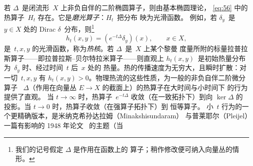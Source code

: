 \documentclass[11pt]{amsart}
\theoremstyle{definition}
\theoremstyle{remark}
\theoremstyle{plain}
\numberwithin{equation}{section}
\renewcommand{\:}{\colon}
\DeclareMathOperator{\spec}{spec}
\begin{document}
若 $\Delta $~是闭流形~$X$ 上非负自伴的二阶椭圆算子，则由基本椭圆理论，
\eqref{eq:56} 中的热算子~$H_t$ 存在。它是\emph{磨光算子}：$H_t$~把分布
映为光滑函数。
例如，若 $\delta _y$~是~$y\in X$ 处的 Dirac
$\delta $~分布，则\footnote{我们的记号假定 $\Delta $ 是作用在函数上的
算子；稍作修改便可纳入向量丛的情形。}
  \begin{equation}\label{eq:59}
     h_t(x,y) = \left( e^{-t\Delta }\delta _y \right)\!(x),\qquad x\in X, 
  \end{equation}
是~$t,x,y$ 的光滑函数，称为\emph{热核}。若 $\Delta $~是~$X$ 上某个黎曼
度量所附的标量拉普拉斯算子——即拉普拉斯–贝尔特拉米算子——则直观上
$h_t(x,y)$~是初始热量分布为~$\delta _y$ 时、经过时间~$t$ 后~$x$ 处的
热量。热的传播速度为无穷大，且瞬时扩散：对一切~$t,x,y$ 有
$h_t(x,y)>0$。物理热流的这些性质，为一般的非负自伴二阶微分算子
~$\Delta $（作用在向量丛 $E\to X$ 的截面上）的热算子在大时间与小时间下
的行为提供了直观。
当 $t\to\infty $ 时，热算子~$e^{-t\Delta }$ 收敛（在一致拓扑下）到向
$\ker \Delta $ 的投影。当 $t\to0$ 时，热算子收敛（在强算子拓扑下）到
恒等算子。
小~$t$ 行为的一个更精确版本，是米纳克希孙达拉姆（Minakshisundaram）
与普莱耶尔（Pleijel）一篇有影响的 1948 年论文~\cite{MP} 的主题（当
\end{document}
